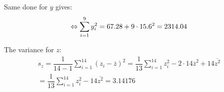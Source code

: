 \noindent Same done for $y$ gives:
\begin{equation*}
  \begin{gathered}
    \Leftrightarrow\sum_{i=1}^{9}y_i^2 = 67.28+9\cdot15.6^2 = 2314.04
  \end{gathered}
\end{equation*}
\par\bigskip
\noindent The variance for $z$:
\begin{equation*}
  \begin{gathered}
    s_z = \dfrac{1}{14-1}\sum_{i=1}^{14}(z_i-\overline{z})^2 = \dfrac{1}{13}\sum_{i=1}^{14}z_i^2-2\cdot14\overline{z}^2+14\overline{z^2}\\
    = \dfrac{1}{13}\sum_{i=1}^{14}z_i^2-14\overline{z^2} = 3.14176
  \end{gathered}
\end{equation*}
\par\bigskip
